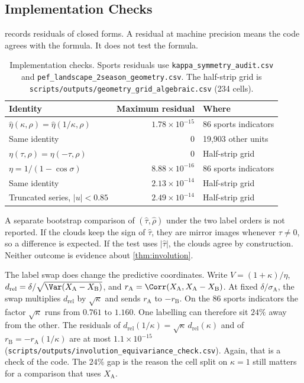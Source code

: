 \subsection{Implementation Checks}
\label{sec:val_checks}

 records residuals of closed forms.
A residual at machine precision means the code agrees with the formula.
It does not test the formula.

\begin{table}[t]
  \centering
  \caption{Implementation checks.
    Sports residuals use \texttt{kappa\_symmetry\_audit.csv} and \texttt{pef\_landscape\_2season\_geometry.csv}.
    The half-strip grid is \texttt{scripts/outputs/geometry\_grid\_algebraic.csv} (234 cells).}
  \label{tab:impl_checks}
  \small
  \begin{tabular}{@{}lrl@{}}
    \toprule
    \textbf{Identity} & \textbf{Maximum residual} & \textbf{Where} \\
    \midrule
    $\hat\eta(\kappa,\rho)=\hat\eta(1/\kappa,\rho)$ & $1.78\times 10^{-15}$ & 86 sports indicators \\
    Same identity & $0$ & 19{,}903 other units \\
    $\eta(\tau,\rho)=\eta(-\tau,\rho)$ & $0$ & Half-strip grid \\
    $\eta = 1/(1-\cos\sigma)$ & $8.88\times 10^{-16}$ & 86 sports indicators \\
    Same identity & $2.13\times 10^{-14}$ & Half-strip grid \\
    Truncated series, $|u|<0.85$ & $2.49\times 10^{-14}$ & Half-strip grid \\
    \bottomrule
  \end{tabular}
\end{table}

A separate bootstrap comparison of $(\hat\tau,\hat\rho)$ under the two label orders is not reported.
If the clouds keep the sign of $\hat\tau$, they are mirror images whenever $\tau\neq 0$, so a difference is expected.
If the test uses $|\hat\tau|$, the clouds agree by construction.
Neither outcome is evidence about \cref{thm:involution}.

The label swap does change the predictive coordinates.
Write $V = (1+\kappa)/\eta$, $d_{\mathrm{rel}} = \delta/\sqrt{\Var(X_{\mathrm{A}}-X_{\mathrm{B}})}$, and $r_{\mathrm{A}} = \Corr(X_{\mathrm{A}}, X_{\mathrm{A}}-X_{\mathrm{B}})$.
At fixed $\delta/\sigma_{\mathrm{A}}$, the swap multiplies $d_{\mathrm{rel}}$ by $\sqrt{\kappa}$ and sends $r_{\mathrm{A}}$ to $-r_{\mathrm{B}}$.
On the 86 sports indicators the factor $\sqrt{\kappa}$ runs from $0.761$ to $1.160$.
One labelling can therefore sit $24\%$ away from the other.
The residuals of $d_{\mathrm{rel}}(1/\kappa) = \sqrt{\kappa}\, d_{\mathrm{rel}}(\kappa)$ and of $r_{\mathrm{B}} = -r_{\mathrm{A}}(1/\kappa)$ are at most $1.1\times 10^{-15}$ (\texttt{scripts/outputs/involution\_equivariance\_check.csv}).
Again, that is a check of the code.
The $24\%$ gap is the reason the cell split on $\kappa = 1$ still matters for a comparison that uses $X_{\mathrm{A}}$.

